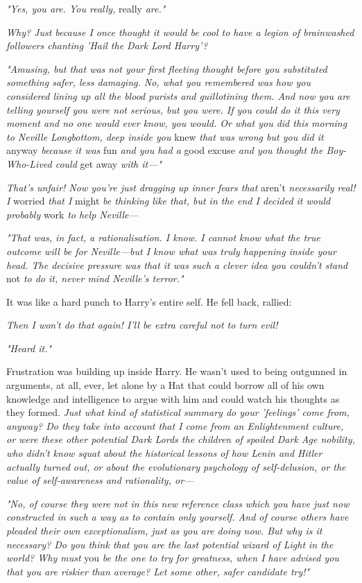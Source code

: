 \emph{"Yes, you are. You really,} really\emph{ are."}

\emph{Why? Just because I once thought it would be cool to have a legion of brainwashed followers chanting 'Hail the Dark Lord Harry'?}

\emph{"Amusing, but that was not your first fleeting thought before you substituted something safer, less damaging. No, what you remembered was how you considered lining up all the blood purists and guillotining them. And now you are telling yourself you were not serious, but you were. If you could do it this very moment and no one would ever know, you would. Or what you did this morning to Neville Longbottom, deep inside you} knew\emph{ that was wrong but you did it} anyway\emph{ because it was} fun\emph{ and you had a} good excuse\emph{ and you thought the Boy-Who-Lived could} get away\emph{ with it---"}

\emph{That's unfair! Now you're just dragging up inner fears that} aren't\emph{ necessarily real! I} worried\emph{ that I} might\emph{ be thinking like that, but in the end I decided it would probably} work\emph{ to help Neville---}

\emph{"That was, in fact, a rationalisation. I know. I cannot know what the true outcome will be for Neville---but I know what was truly happening inside your head. The decisive pressure was that it was such a clever idea you couldn't stand} not\emph{ to do it, never mind Neville's terror."}

It was like a hard punch to Harry's entire self. He fell back, rallied:

\emph{Then I won't do that again! I'll be extra careful not to turn evil!}

\emph{"Heard it."}

Frustration was building up inside Harry. He wasn't used to being outgunned in arguments, at all, ever, let alone by a Hat that could borrow all of his own knowledge and intelligence to argue with him and could watch his thoughts as they formed. \emph{Just what kind of statistical summary do your 'feelings' come from, anyway? Do they take into account that I come from an Enlightenment culture, or were these other potential Dark Lords the children of spoiled Dark Age nobility, who didn't know squat about the historical lessons of how Lenin and Hitler actually turned out, or about the evolutionary psychology of self-delusion, or the value of self-awareness and rationality, or---}

\emph{"No, of course they were not in this new reference class which you have just now constructed in such a way as to contain only yourself. And of course others have pleaded their own exceptionalism, just as you are doing now. But why is it necessary? Do you think that you are the last potential wizard of Light in the world? Why must} you\emph{ be the one to try for greatness, when I have advised you that you are riskier than average? Let some other, safer candidate try!"}

